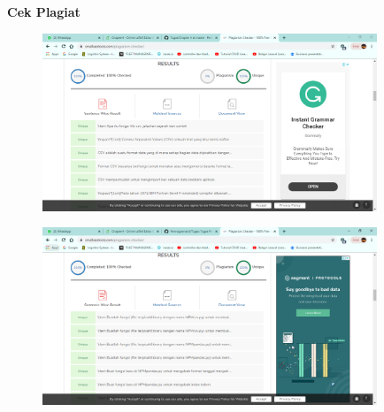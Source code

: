 \textbf{Cek Plagiat}
\begin{figure}[!htbp]
	\includegraphics[width=10cm]{figures/plagiat1.PNG}
	\centering
\end{figure}
\begin{figure}[!htbp]
	\includegraphics[width=10cm]{figures/plagiat2.PNG}
	\centering
\end{figure}
	
	

    
    
